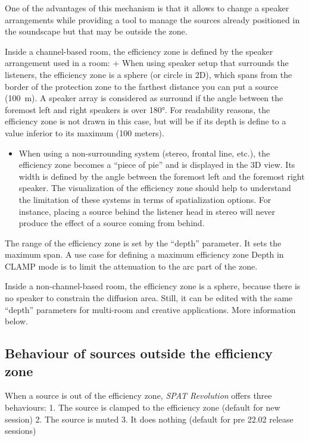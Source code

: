 \documentclass[
  letterpaper,
  DIV=11,
  numbers=noendperiod]{scrreport}
\providecommand{\tightlist}{%
  \setlength{\itemsep}{0pt}\setlength{\parskip}{0pt}}\usepackage{longtable,booktabs,array}
\begin{document}
One of the advantages of this mechanism is that it allows to change a
speaker arrangements while providing a tool to manage the sources
already positioned in the soundscape but that may be outside the zone.

Inside a channel-based room, the efficiency zone is defined by the
speaker arrangement used in a room: + When using speaker setup that
surrounds the listeners, the efficiency zone is a sphere (or circle in
2D), which spans from the border of the protection zone to the farthest
distance you can put a source (100~m). A speaker array is considered as
surround if the angle between the foremost left and right speakers is
over 180°. For readability reasons, the efficiency zone is not drawn in
this case, but will be if its depth is define to a value inferior to its
maximum (100 meters).

\begin{itemize}
\tightlist
\item
  When using a non-surrounding system (stereo, frontal line, etc.), the
  efficiency zone becomes a ``piece of pie'' and is displayed in the 3D
  view. Its width is defined by the angle between the foremost left and
  the foremost right speaker. The visualization of the efficiency zone
  should help to understand the limitation of these systems in terms of
  spatialization options. For instance, placing a source behind the
  listener head in stereo will never produce the effect of a source
  coming from behind.
\end{itemize}

The range of the efficiency zone is set by the ``depth'' parameter. It
sets the maximum span. A use case for defining a maximum efficiency zone
Depth in CLAMP mode is to limit the attenuation to the arc part of the
zone.

Inside a non-channel-based room, the efficiency zone is a sphere,
because there is no speaker to constrain the diffusion area. Still, it
can be edited with the same ``depth'' parameters for multi-room and
creative applications. More information below.

\hypertarget{behaviour-of-sources-outside-the-efficiency-zone}{%
\subsection{Behaviour of sources outside the efficiency
zone}\label{behaviour-of-sources-outside-the-efficiency-zone}}

When a source is out of the efficiency zone, \emph{SPAT Revolution}
offers three behaviours: 1. The source is clamped to the efficiency zone
(default for new session) 2. The source is muted 3. It does nothing
(default for pre 22.02 release sessions)
\end{document}
